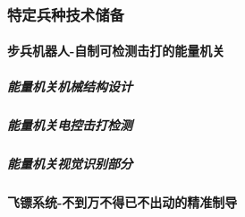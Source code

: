 \subsubsection{特定兵种技术储备}

    \paragraph{步兵机器人-自制可检测击打的能量机关}

        \subparagraph{能量机关机械结构设计}

        \subparagraph{能量机关电控击打检测}

        \subparagraph{能量机关视觉识别部分}

    \paragraph{飞镖系统-不到万不得已不出动的精准制导}